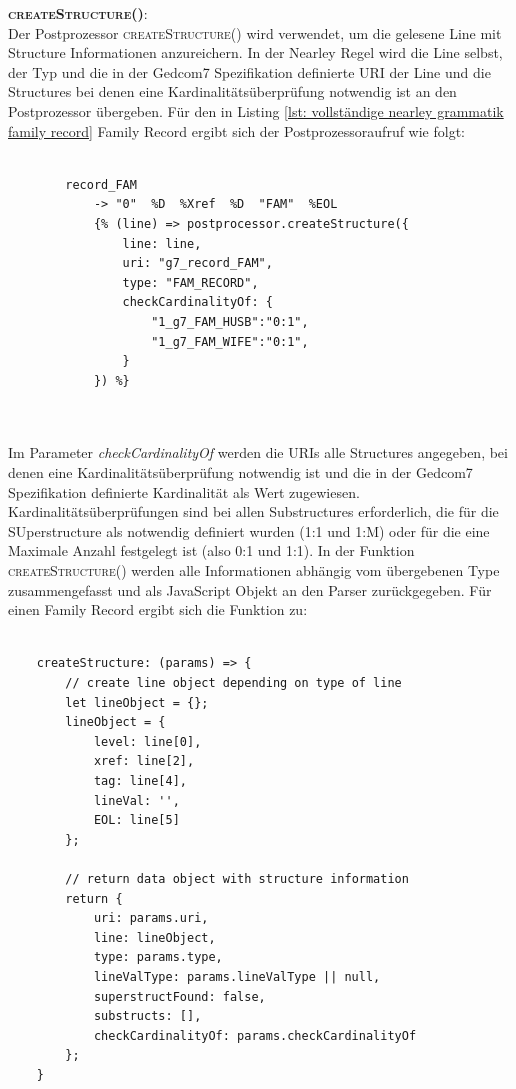 \vspace{1em}
\textsc{\textbf{createStructure()}:} \vspace{0.5em} \\
Der Postprozessor \textsc{createStructure()} wird verwendet, um die gelesene Line mit Structure Informationen anzureichern. In der Nearley Regel wird die Line selbst, der Typ und die in der Gedcom7 Spezifikation definierte URI der Line und die Structures bei denen eine Kardinalitätsüberprüfung notwendig ist an den Postprozessor übergeben. Für den in Listing \ref{lst: vollständige nearley grammatik family record} Family Record ergibt sich der Postprozessoraufruf wie folgt:
\\ \\
\begin{minipage}{1.0\textwidth} \small
	\begin{lstlisting}
		record_FAM
			-> "0"  %D  %Xref  %D  "FAM"  %EOL
			{% (line) => postprocessor.createStructure({
				line: line,
				uri: "g7_record_FAM", 
				type: "FAM_RECORD", 
				checkCardinalityOf: {
					"1_g7_FAM_HUSB":"0:1", 
					"1_g7_FAM_WIFE":"0:1",
				}
			}) %}
	\end{lstlisting}
	\label{lst: nearley regel family record mit postprozessor}
\end{minipage}
\\ \\
Im Parameter \textit{checkCardinalityOf} werden die URIs alle Structures angegeben, bei denen eine Kardinalitätsüberprüfung notwendig ist und die in der Gedcom7 Spezifikation definierte Kardinalität als Wert zugewiesen. Kardinalitätsüberprüfungen sind bei allen Substructures erforderlich, die für die SUperstructure als notwendig definiert wurden (1:1 und 1:M) oder für die eine Maximale Anzahl festgelegt ist (also 0:1 und 1:1). In der Funktion \textsc{createStructure()} werden alle Informationen abhängig vom übergebenen Type zusammengefasst und als JavaScript Objekt an den Parser zurückgegeben. Für einen Family Record ergibt sich die Funktion zu:
\\ \\
\begin{minipage}{1.0\textwidth} \small
	\begin{lstlisting}
	createStructure: (params) => {
		// create line object depending on type of line
		let lineObject = {};
		lineObject = { 
			level: line[0], 
			xref: line[2], 
			tag: line[4], 
			lineVal: '', 
			EOL: line[5] 
		};
		
		// return data object with structure information
		return {
			uri: params.uri,
			line: lineObject,
			type: params.type,
			lineValType: params.lineValType || null,
			superstructFound: false,
			substructs: [],
			checkCardinalityOf: params.checkCardinalityOf
		};
	}
	\end{lstlisting}
	\label{lst: createStructure für Family Record}
\end{minipage}
\\ \\

